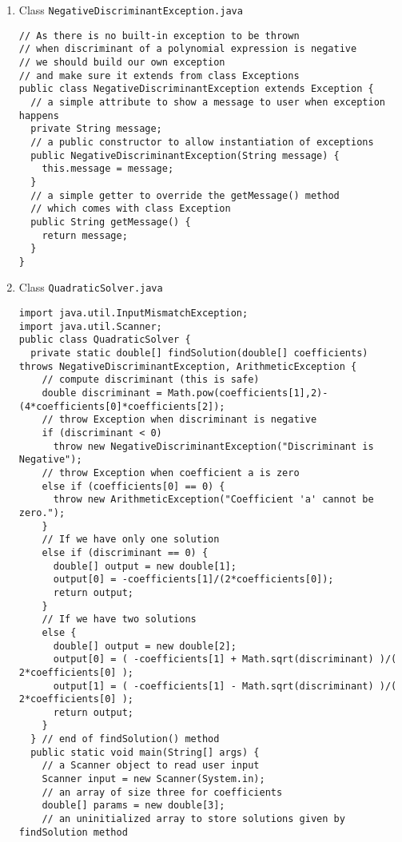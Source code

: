 \begin{enumerate}
\item Class \texttt{NegativeDiscriminantException.java}
\lstset{language=java, tabsize=2, numbers=left}
\begin{lstlisting}
// As there is no built-in exception to be thrown
// when discriminant of a polynomial expression is negative
// we should build our own exception
// and make sure it extends from class Exceptions
public class NegativeDiscriminantException extends Exception {
  // a simple attribute to show a message to user when exception happens
  private String message;
  // a public constructor to allow instantiation of exceptions
  public NegativeDiscriminantException(String message) {
    this.message = message;
  }
  // a simple getter to override the getMessage() method
  // which comes with class Exception
  public String getMessage() {
    return message;
  }
}
\end{lstlisting}
\item Class \texttt{QuadraticSolver.java}
\begin{lstlisting}
import java.util.InputMismatchException;
import java.util.Scanner;
public class QuadraticSolver {
  private static double[] findSolution(double[] coefficients) throws NegativeDiscriminantException, ArithmeticException {
    // compute discriminant (this is safe)
    double discriminant = Math.pow(coefficients[1],2)-(4*coefficients[0]*coefficients[2]);
    // throw Exception when discriminant is negative
    if (discriminant < 0)
      throw new NegativeDiscriminantException("Discriminant is Negative");
    // throw Exception when coefficient a is zero
    else if (coefficients[0] == 0) {
      throw new ArithmeticException("Coefficient 'a' cannot be zero.");
    }
    // If we have only one solution
    else if (discriminant == 0) {
      double[] output = new double[1];
      output[0] = -coefficients[1]/(2*coefficients[0]);
      return output;
    }
    // If we have two solutions
    else {
      double[] output = new double[2];
      output[0] = ( -coefficients[1] + Math.sqrt(discriminant) )/( 2*coefficients[0] );
      output[1] = ( -coefficients[1] - Math.sqrt(discriminant) )/( 2*coefficients[0] );
      return output;  
    }
  } // end of findSolution() method
  public static void main(String[] args) {
    // a Scanner object to read user input
    Scanner input = new Scanner(System.in);
    // an array of size three for coefficients
    double[] params = new double[3];
    // an uninitialized array to store solutions given by findSolution method

\end{lstlisting}
\end{enumerate}
